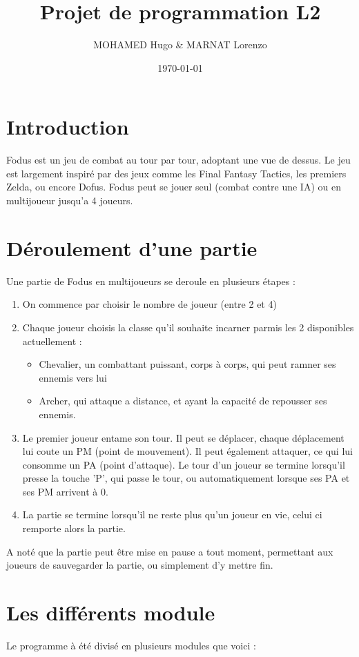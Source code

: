 \documentclass[a4paper, 11pt]{article}
\title{Projet de programmation L2}
\author{MOHAMED Hugo & MARNAT Lorenzo}
\date{\today}
\begin{document}
\maketitle

\newpage

\section{Introduction}
Fodus est un jeu de combat au tour par tour, adoptant une vue de dessus. Le jeu est largement inspiré par des jeux comme les Final Fantasy Tactics, les premiers Zelda, ou encore Dofus. Fodus peut se jouer seul (combat contre une IA) ou en multijoueur jusqu'a 4 joueurs.

\section{Déroulement d'une partie}
Une partie de Fodus en multijoueurs se deroule en plusieurs étapes :
\begin{enumerate}
\item On commence par choisir le nombre de joueur (entre 2 et 4)
\item Chaque joueur choisis la classe qu'il souhaite incarner parmis les 2 disponibles actuellement :
  \begin{itemize}
  \item Chevalier, un combattant puissant, corps à corps, qui peut ramner ses ennemis vers lui
  \item Archer, qui attaque a distance, et ayant la capacité de repousser ses ennemis.
  \end{itemize}
\item Le premier joueur entame son tour. Il peut se déplacer, chaque déplacement lui coute un PM (point de mouvement). Il peut également attaquer, ce qui lui consomme un PA (point d'attaque). Le tour d'un joueur se termine lorsqu'il presse la touche 'P', qui passe le tour, ou automatiquement lorsque ses PA et ses PM arrivent à 0.
\item La partie se termine lorsqu'il ne reste plus qu'un joueur en vie, celui ci remporte alors la partie.
\end{enumerate}

A noté que la partie peut être mise en pause a tout moment, permettant aux joueurs de sauvegarder la partie, ou simplement d'y mettre fin.

\section{Les différents module}
Le programme à été divisé en plusieurs modules que voici :
\end{document}
